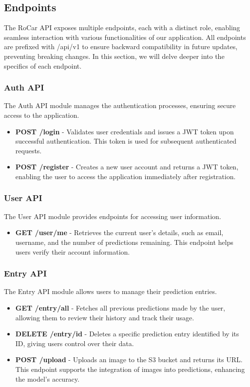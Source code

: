 \subsection{Endpoints}
The RoCar API exposes multiple endpoints, each with a distinct role, enabling seamless interaction with various functionalities of our application. All endpoints are prefixed with /api/v1 to ensure backward compatibility in future updates, preventing breaking changes. In this section, we will delve deeper into the specifics of each endpoint.

\subsubsection{Auth API}
The Auth API module manages the authentication processes, ensuring secure access to the application.
\begin{itemize}
\item \textbf{POST /login} - Validates user credentials and issues a JWT token upon successful authentication. This token is used for subsequent authenticated requests.
\item \textbf{POST /register} - Creates a new user account and returns a JWT token, enabling the user to access the application immediately after registration.
\end{itemize}

\subsubsection{User API}
The User API module provides endpoints for accessing user information.
\begin{itemize}
\item \textbf{GET /user/me} - Retrieves the current user's details, such as email, username, and the number of predictions remaining. This endpoint helps users verify their account information.
\end{itemize}

\subsubsection{Entry API}
The Entry API module allows users to manage their prediction entries.
\begin{itemize}
\item \textbf{GET /entry/all} - Fetches all previous predictions made by the user, allowing them to review their history and track their usage.
\item \textbf{DELETE /entry/{id}} - Deletes a specific prediction entry identified by its ID, giving users control over their data.
\item \textbf{POST /upload} - Uploads an image to the S3 bucket and returns its URL. This endpoint supports the integration of images into predictions, enhancing the model's accuracy.
\end{itemize}

